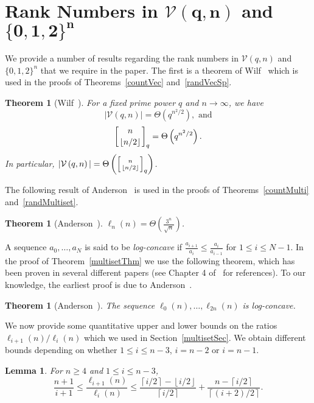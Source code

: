 \documentclass[11 pt]{article}
\newtheorem{thm}[equation]{Theorem}
\newtheorem{lem}[equation]{Lemma}
\theoremstyle{definition}
\theoremstyle{case}
\numberwithin{equation}{section}
\newcommand{\qbinom}[3]{\left[\genfrac{}{}{0pt}{}{#1}{#2}\right]_{#3}}
\newcommand{\Vectors}[2]{\mathcal{V}\left(#1,#2\right)}
\begin{document}
  \appendix
  \section{Rank Numbers in \texorpdfstring{$\boldsymbol{\Vectors{q}{n}}$}{V(q,n)} and \texorpdfstring{$\boldsymbol{\{0,1,2\}^n}$}{{0,1,2}\textasciicircum n}}
  
We provide a number of results regarding the rank numbers in $\Vectors{q}{n}$ and $\{0,1,2\}^n$ that we require in the paper. The first is a theorem of Wilf~\cite{Wilf} which is used in the proofs of Theorems~\ref{countVec} and~\ref{randVecSp}.
  
\begin{thm}[Wilf~\cite{Wilf}]
\label{wilf}
For a fixed prime power $q$ and $n\to\infty$, we have
\[|\Vectors{q}{n}|=\Theta\left(q^{n^2/2}\right),\text{ and}\]
\[\qbinom{n}{\left\lfloor n/2\right\rfloor}{q}=\Theta\left(q^{n^2/2}\right).\]
In particular, $|\Vectors{q}{n}|=\Theta\left(\qbinom{n}{\left\lfloor n/2\right\rfloor}{q}\right)$.
\end{thm}

The following result of Anderson~\cite{AndersonVariance} is used in the proofs of Theorems~\ref{countMulti} and~\ref{randMultiset}.

\begin{thm}[Anderson~\cite{AndersonVariance}]
\label{anderson}
$\ell_n(n)=\Theta\left(\frac{3^n}{\sqrt{n}}\right)$.
\end{thm}

A sequence $a_0,\dots,a_N$ is said to be \emph{log-concave} if $\frac{a_{i+1}}{a_i}\leq \frac{a_i}{a_{i-1}}$ for $1\leq i\leq N-1$. In the proof of Theorem~\ref{multisetThm} we use the following theorem, which has been proven in several different papers (see Chapter 4 of~\cite{AndersonBook} for references). To our knowledge, the earliest proof is due to Anderson~\cite{Andersondivisors}.

\begin{thm}[Anderson~\cite{Andersondivisors}]
\label{logConcave}
The sequence $\ell_0(n),\dots,\ell_{2n}(n)$ is log-concave. 
\end{thm}

We now provide some quantitative upper and lower bounds on the ratios $\ell_{i+1}(n)/\ell_i(n)$ which we used in Section~\ref{multisetSec}. We obtain different bounds depending on whether $1\leq i\leq n-3$, $i=n-2$ or $i=n-1$.

\begin{lem}
\label{ratio1}
For $n\geq 4$ and $1\leq i\leq n-3$,
\[\frac{n+1}{i+1}\leq \frac{\ell_{i+1}(n)}{\ell_i(n)}\leq \frac{\left\lceil i/2\right\rceil - \left\lfloor i/2\right\rfloor}{\left \lceil i/2\right\rceil} + \frac{n-\left\lceil i/2\right\rceil}{\left\lceil (i+2)/2\right\rceil}.\]
\end{lem}
\end{document}

